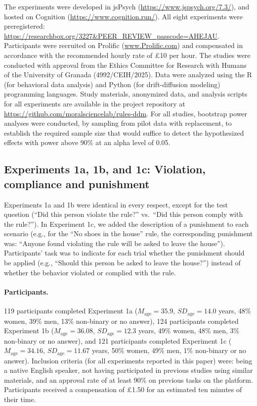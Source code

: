 \documentclass[pdflatex,sn-nature]{sn-jnl}
\begin{document}
The experiments were developed in jsPsych (\url{https://www.jspsych.org/7.3/}), and hosted on Cognition (\url{https://www.cognition.run/}). All eight experiments were preregistered: \url{https://researchbox.org/3227\&PEER\_REVIEW\_passcode=AHEJAU}. Participants were recruited on Prolific (\url{www.Prolific.com}) and compensated in accordance with the recommended hourly rate of £10 per hour. The studies were conducted with approval from the Ethics Committee for Research with Humans of the University of Granada (4992/CEIH/2025). Data were analyzed using the R (for behavioral data analysis) and Python (for drift-diffusion modeling) programming languages. Study materials, anonymized data, and analysis scripts for all experiments are available in the project repository at \url{https://github.com/moralsciencelab/rules-ddm}. For all studies, bootstrap power analyses were conducted, by sampling from pilot data with replacement, to establish the required sample size that would suffice to detect the hypothesized effects with power above 90\% at an alpha level of 0.05.

\subsection{Experiments 1a, 1b, and 1c: Violation, compliance and punishment}\label{subsec:exp1}

Experiments 1a and 1b were identical in every respect, except for the test question (``Did this person violate the rule?'' vs.\ ``Did this person comply with the rule?''). In Experiment 1c, we added the description of a punishment to each scenario (e.g., for the ``No shoes in the house'' rule, the corresponding punishment was: ``Anyone found violating the rule will be asked to leave the house''). Participants' task was to indicate for each trial whether the punishment should be applied (e.g., ``Should this person be asked to leave the house?'') instead of whether the behavior violated or complied with the rule.

\paragraph{Participants.}
119 participants completed Experiment 1a ($M_\text{age} = 35.9$, $\mathit{SD}_\text{age} = 14.0$ years, 48\% women, 39\% men, 13\% non-binary or no answer), 124 participants completed Experiment 1b ($M_\text{age} = 36.08$, $\mathit{SD}_\text{age} = 12.3$ years, 49\% women, 48\% men, 3\% non-binary or no answer), and 121 participants completed Experiment 1c ($M_\text{age} = 34.16$, $\mathit{SD}_\text{age} = 11.67$ years, 50\% women, 49\% men, 1\% non-binary or no answer). Inclusion criteria (for all experiments reported in this paper) were: being a native English speaker, not having participated in previous studies using similar materials, and an approval rate of at least 90\% on previous tasks on the platform. Participants received a compensation of £1.50 for an estimated ten minutes of their time.
\end{document}
